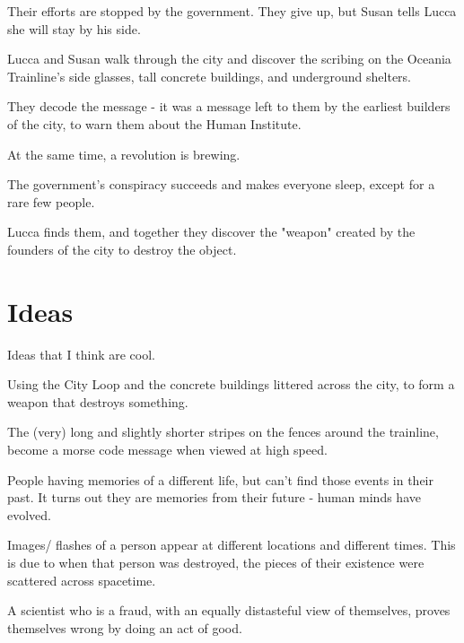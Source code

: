 \documentclass[11pt]{article}
\begin{document}
Their efforts are stopped by the government. They give up, but Susan tells Lucca she will stay by his side.




Lucca and Susan walk through the city and discover the scribing on the Oceania Trainline's side glasses, tall concrete buildings, and underground shelters. 

They decode the message - it was a message left to them by the earliest builders of the city, to warn them about the Human Institute. 

At the same time, a revolution is brewing. 




The government's conspiracy succeeds and makes everyone sleep, except for a rare few people. 

Lucca finds them, and together they discover the "weapon" created by the founders of the city to destroy the object. 




\section{Ideas}
Ideas that I think are cool.

Using the City Loop and the concrete buildings littered across the city, to form a weapon that destroys something.

The (very) long and slightly shorter stripes on the fences around the trainline, become a morse code message when viewed at high speed.

People having memories of a different life, but can't find those events in their past. It turns out they are memories from their future - human minds have evolved.

Images/ flashes of a person appear at different locations and different times. This is due to when that person was destroyed, the pieces of their existence were scattered across spacetime. 

A scientist who is a fraud, with an equally distasteful view of themselves, proves themselves wrong by doing an act of good.
\newpage
\end{document}
